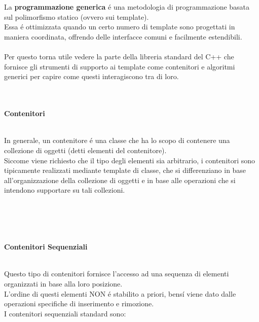 \documentclass{article}
\begin{document}
\\ \\La \textbf{programmazione generica} \'e una metodologia di programmazione basata sul polimorfismo statico (ovvero sui template). \\ Essa \'e ottimizzata quando un certo numero di template sono progettati in maniera coordinata, offrendo delle interfacce comuni e facilmente estendibili.\\ \\Per questo torna utile vedere la parte della libreria standard del C++ che fornisce gli strumenti di supporto ai template come contenitori e algoritmi generici per capire come questi interagiscono tra di loro.
\\ \\ \\
\begin{large}\textbf{\textcolor{blu}{Contenitori}} \\ \\ \end{large}
In generale, un contenitore \'e una classe che ha lo scopo di contenere una collezione di oggetti (detti elementi del contenitore).\\
Siccome viene richiesto che il tipo degli elementi sia arbitrario, i contenitori sono tipicamente realizzati mediante template di classe, che si differenziano in base all'organizzazione della collezione di oggetti e in base alle operazioni che si intendono supportare su tali collezioni.
\\ \\ \\ \\ \\
\begin{large}\textbf{\textcolor{blu}{Contenitori Sequenziali}} \\ \\ \end{large}
Questo tipo di contenitori fornisce l'accesso ad una sequenza di elementi organizzati in base alla loro posizione.\\L'ordine di questi elementi NON \'e stabilito a priori, bens\'i viene dato dalle operazioni specifiche di inserimento e rimozione.\\I contenitori sequenziali standard sono:\\
\end{document}
